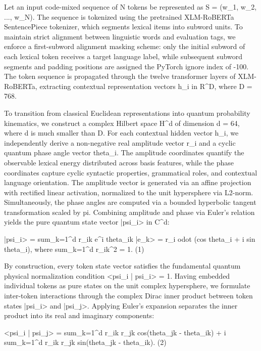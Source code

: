 \documentclass[10pt,twocolumn,letterpaper]{article}
\theoremstyle{definition}
\begin{document}
Let an input code-mixed sequence of N tokens be represented as S = (w\_1, w\_2, ..., w\_N). The sequence is tokenized using the pretrained XLM-RoBERTa SentencePiece tokenizer, which segments lexical items into subword units. To maintain strict alignment between linguistic words and evaluation tags, we enforce a first-subword alignment masking scheme: only the initial subword of each lexical token receives a target language label, while subsequent subword segments and padding positions are assigned the PyTorch ignore index of -100. The token sequence is propagated through the twelve transformer layers of XLM-RoBERTa, extracting contextual representation vectors h\_i in R^D, where D = 768.

To transition from classical Euclidean representations into quantum probability kinematics, we construct a complex Hilbert space H^d of dimension d = 64, where d is much smaller than D. For each contextual hidden vector h\_i, we independently derive a non-negative real amplitude vector r\_i and a cyclic quantum phase angle vector theta\_i. The amplitude coordinates quantify the observable lexical energy distributed across basis features, while the phase coordinates capture cyclic syntactic properties, grammatical roles, and contextual language orientation. The amplitude vector is generated via an affine projection with rectified linear activation, normalized to the unit hypersphere via L2-norm. Simultaneously, the phase angles are computed via a bounded hyperbolic tangent transformation scaled by pi. Combining amplitude and phase via Euler's relation yields the pure quantum state vector |psi\_i> in C^d:

|psi\_i> = sum\_{k=1}^d r\_{ik} e^{i theta\_{ik}} |e\_k> = r\_i odot (cos theta\_i + i sin theta\_i),  where sum\_{k=1}^d r\_{ik}^2 = 1.    (1)

By construction, every token state vector satisfies the fundamental quantum physical normalization condition <psi\_i | psi\_i> = 1. Having embedded individual tokens as pure states on the unit complex hypersphere, we formulate inter-token interactions through the complex Dirac inner product between token states |psi\_i> and |psi\_j>. Applying Euler's expansion separates the inner product into its real and imaginary components:

<psi\_i | psi\_j> = sum\_{k=1}^d r\_{ik} r\_{jk} cos(theta\_{jk} - theta\_{ik}) + i sum\_{k=1}^d r\_{ik} r\_{jk} sin(theta\_{jk} - theta\_{ik}).    (2)
\end{document}
